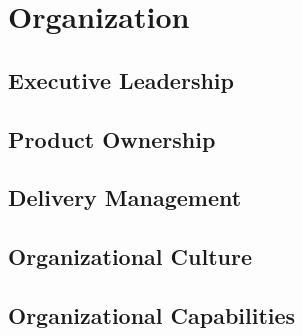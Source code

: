 \part{Organization}\label{pt:organization} %

\chapter{Executive Leadership}

\chapter{Product Ownership}

\chapter{ Delivery Management}

\chapter{Organizational Culture}

\chapter{Organizational Capabilities}
